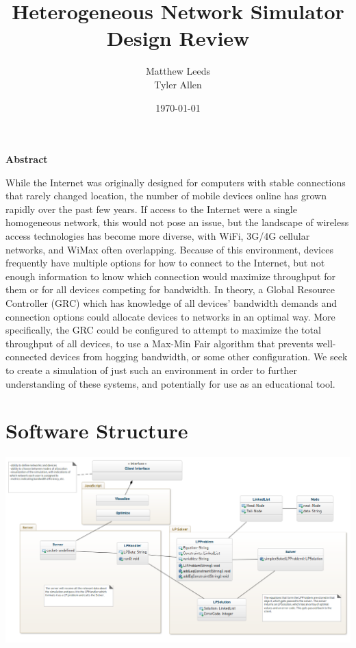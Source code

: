 \documentclass[11pt]{article}
\title{Heterogeneous Network Simulator Design Review}
\author{Matthew Leeds\\
	Tyler Allen\\}
\date{\today}
\begin{document}
\maketitle

{\setlength{\parindent}{0cm} \large \textbf{Abstract}}

While the Internet was originally designed for computers with stable connections that rarely changed location, the number of mobile devices online has grown rapidly over the past few years. If access to the Internet were a single homogeneous network, this would not pose an issue, but the landscape of wireless access technologies has become more diverse, with WiFi, 3G/4G cellular networks, and WiMax often overlapping. Because of this environment, devices frequently have multiple options for how to connect to the Internet, but not enough information to know which connection would maximize throughput for them or for all devices competing for bandwidth. In theory, a Global Resource Controller (GRC) which has knowledge of all devices' bandwidth demands and connection options could allocate devices to networks in an optimal way. More specifically, the GRC could be configured to attempt to maximize the total throughput of all devices, to use a Max-Min Fair algorithm that prevents well-connected devices from hogging bandwidth, or some other configuration. We seek to create a simulation of just such an environment in order to further understanding of these systems, and potentially for use as an educational tool.

\section{Software Structure}

\begin{center}
\includegraphics[width=600px, angle=270]{model.png}

\end{center}
\end{document}
